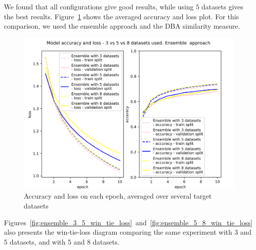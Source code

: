 \documentclass[a4paper,11pt,twoside]{report}
\theoremstyle{definition}
\begin{document}
We found that all configurations give good results, while using $5$ datasets gives the best results. Figure~\ref{fig:ensemble_3_5_8} shows the averaged accuracy and loss plot. For this comparison, we used the ensemble approach and the DBA similarity measure.

\FloatBarrier
\begin{figure}[h!t]
\centering
\includegraphics[width=17cm]{imgs/ensemble_dba_3_vs_5/loss_acc.png}
\caption{Accuracy and loss on each epoch, averaged over several target datasets}
\label{fig:ensemble_3_5_8}
\end{figure}
\FloatBarrier


Figures~\ref{fig:ensemble_3_5_win_tie_loss}~and~\ref{fig:ensemble_5_8_win_tie_loss} also presents the win-tie-loss diagram comparing the same experiment with 3 and 5 datasets, and with 5 and 8 datasets.
\end{document}
